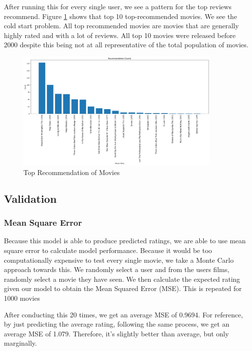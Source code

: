 \documentclass[12pt]{article}
\numberwithin{equation}{section}
\begin{document}
After running this for every single user, we see a pattern for the top reviews recommend. Figure \ref{fig:top_recs_cf} shows that top 10 top-recommended movies. We see the cold start problem. All top recommended movies are movies that are generally highly rated and with a lot of reviews. All top 10 movies were released before 2000 despite this being not at all representative of the total population of movies.

\begin{figure}[h!]
    \begin{minipage}[b]{01\linewidth}
         \centering
  	\includegraphics[width=0.9\textwidth]{colab_filter.png}
  	\caption{Top Recommendation of Movies}
  	\label{fig:top_recs_cf}
    \end{minipage}
\end{figure}

\subsection{Validation}

\subsubsection{Mean Square Error}

Because this model is able to produce predicted ratings, we are able to use mean square error to calculate model performance.  Because it would be too computationally expensive to test every single movie, we take a Monte Carlo approach towards this. We randomly select a user and from the users films, randomly select a movie they have seen. We then calculate the expected rating given our model to obtain the Mean Squared Error (MSE). This is repeated for 1000 movies

After conducting this 20 times, we get an average MSE of 0.9694. For reference, by just predicting the average rating, following the same process, we get an average MSE of 1.079. Therefore, it's slightly better than average, but only marginally. 
\end{document}
